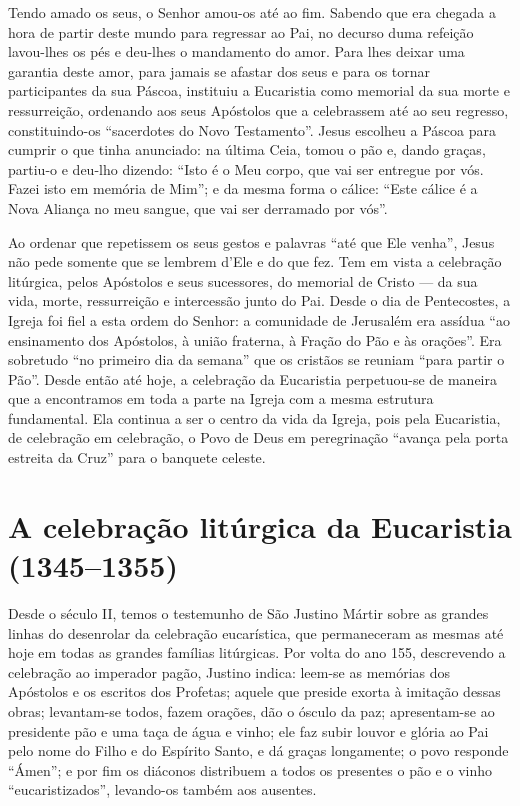 Tendo amado os seus, o Senhor amou-os até ao fim. Sabendo que era chegada a hora de partir deste mundo para regressar ao Pai, no decurso duma refeição lavou-lhes os pés e deu-lhes o mandamento do amor. Para lhes deixar uma garantia deste amor, para jamais se afastar dos seus e para os tornar participantes da sua Páscoa, instituiu a Eucaristia como memorial da sua morte e ressurreição, ordenando aos seus Apóstolos que a celebrassem até ao seu regresso, constituindo-os ``sacerdotes do Novo Testamento''. Jesus escolheu a Páscoa para cumprir o que tinha anunciado: na última Ceia, tomou o pão e, dando graças, partiu-o e deu-lho dizendo: ``Isto é o Meu corpo, que vai ser entregue por vós. Fazei isto em memória de Mim''; e da mesma forma o cálice: ``Este cálice é a Nova Aliança no meu sangue, que vai ser derramado por vós''.

Ao ordenar que repetissem os seus gestos e palavras ``até que Ele venha'', Jesus não pede somente que se lembrem d'Ele e do que fez. Tem em vista a celebração litúrgica, pelos Apóstolos e seus sucessores, do memorial de Cristo --- da sua vida, morte, ressurreição e intercessão junto do Pai. Desde o dia de Pentecostes, a Igreja foi fiel a esta ordem do Senhor: a comunidade de Jerusalém era assídua ``ao ensinamento dos Apóstolos, à união fraterna, à Fração do Pão e às orações''. Era sobretudo ``no primeiro dia da semana'' que os cristãos se reuniam ``para partir o Pão''. Desde então até hoje, a celebração da Eucaristia perpetuou-se de maneira que a encontramos em toda a parte na Igreja com a mesma estrutura fundamental. Ela continua a ser o centro da vida da Igreja, pois pela Eucaristia, de celebração em celebração, o Povo de Deus em peregrinação ``avança pela porta estreita da Cruz'' para o banquete celeste.

\section{A celebração litúrgica da Eucaristia (1345--1355)}

Desde o século II, temos o testemunho de São Justino Mártir sobre as grandes linhas do desenrolar da celebração eucarística, que permaneceram as mesmas até hoje em todas as grandes famílias litúrgicas. Por volta do ano 155, descrevendo a celebração ao imperador pagão, Justino indica: leem-se as memórias dos Apóstolos e os escritos dos Profetas; aquele que preside exorta à imitação dessas obras; levantam-se todos, fazem orações, dão o ósculo da paz; apresentam-se ao presidente pão e uma taça de água e vinho; ele faz subir louvor e glória ao Pai pelo nome do Filho e do Espírito Santo, e dá graças longamente; o povo responde ``Ámen''; e por fim os diáconos distribuem a todos os presentes o pão e o vinho ``eucaristizados'', levando-os também aos ausentes.

